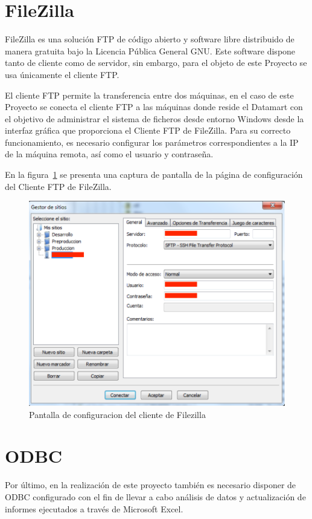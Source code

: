 \documentclass[a4paper, 12pt]{book}
\begin{document}
\section{FileZilla}
\label{sec:FileZilla}
FileZilla es una solución FTP de código abierto y software libre distribuido de manera gratuita bajo la Licencia Pública General GNU. Este software dispone tanto de cliente como de servidor, sin embargo, para el objeto de este Proyecto se usa únicamente el cliente FTP.

El cliente FTP permite la transferencia entre dos máquinas, en el caso de este Proyecto se conecta el cliente FTP a las máquinas donde reside el Datamart con el objetivo de administrar el sistema de ficheros desde entorno Windows desde la interfaz gráfica que proporciona el Cliente FTP de FileZilla. Para su correcto funcionamiento, es necesario configurar los parámetros correspondientes a la IP de la máquina remota, así como el usuario y contraseña.

En la figura~\ref{fig:FileZilla_Config} se presenta una captura de pantalla de la página de configuración del Cliente FTP de FileZilla.

\begin{figure}
   \centering
   \includegraphics[width=12cm, keepaspectratio]{img/filezillaconfig}
   \caption{Pantalla de configuracion del cliente de Filezilla}
   \label{fig:FileZilla_Config}
\end{figure}

\section{ODBC}
\label{sec:ODBC}
Por último, en la realización de este proyecto también es necesario disponer de ODBC configurado con el fin de llevar a cabo análisis de datos y actualización de informes ejecutados a través de Microsoft Excel.
\end{document}
